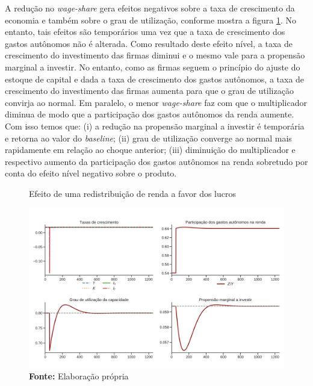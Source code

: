 A redução no \textit{wage-share} gera efeitos negativos sobre a taxa de crescimento da economia e também sobre o grau de utilização, conforme mostra a figura \ref{choque_2}. No entanto, tais efeitos são temporários uma vez que a taxa de crescimento dos gastos autônomos não é alterada. 
Como resultado deste efeito nível, a taxa de crescimento do investimento das firmas diminui e o mesmo vale para a propensão marginal a investir.
No entanto, como as firmas seguem o princípio do ajuste do estoque de capital e dada a taxa de crescimento dos gastos autônomos, a taxa de crescimento do investimento das firmas aumenta para que o grau de utilização convirja ao normal.
Em paralelo, o menor \textit{wage-share} faz com que o multiplicador diminua de modo que a participação dos gastos autônomos da renda aumente.
Com isso temos que: (i) a redução na propensão marginal a investir é temporária e retorna ao valor do \textit{baseline}; (ii) grau de utilização converge ao normal mais rapidamente em relação ao choque anterior; (iii) diminuição do multiplicador e respectivo aumento da participação dos gastos autônomos na renda sobretudo por conta do efeito nível negativo sobre o produto.


\begin{figure}[H]
	\centering
	\caption{Efeito de uma redistribuição de renda a favor dos lucros}
	\label{choque_2}
	\includegraphics[width=\textwidth]{../../Modelo/Versoes/Shock_2.png}
	\caption*{\textbf{Fonte:} Elaboração própria}
\end{figure}

